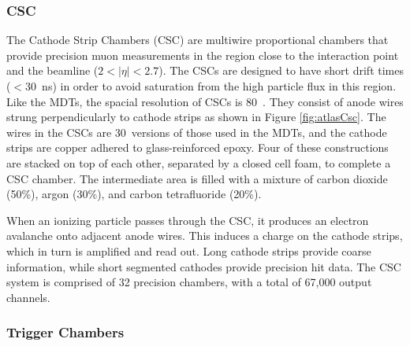 \cite{muonTdr}

\subsubsection{CSC} %

\begin{figure}[h!]
\captionsetup[subfigure]{position=b}
\centering
{}
\caption{}
\label{fig:}
\end{figure}

The Cathode Strip Chambers (CSC) are multiwire proportional chambers that provide precision muon measurements in the region close to the interaction point and the beamline ($2<|\eta|<2.7$).
The CSCs are designed to have short drift times ($<30$~ns) in order to avoid saturation from the high particle flux in this region.
Like the MDTs, the spacial resolution of CSCs is 80~\um.
They consist of anode wires strung perpendicularly to cathode strips as shown in Figure \ref{fig:atlasCsc}.
The wires in the CSCs are 30~\um versions of those used in the MDTs, and the cathode strips are copper adhered to glass-reinforced epoxy.
Four of these constructions are stacked on top of each other, separated by a closed cell foam, to complete a CSC chamber.
The intermediate area is filled with a mixture of carbon dioxide (50\%), argon (30\%), and carbon tetrafluoride (20\%).

When an ionizing particle passes through the CSC, it produces an electron avalanche onto adjacent anode wires.
This induces a charge on the cathode strips, which in turn is amplified and read out.
Long cathode strips provide coarse information, while short segmented cathodes provide precision hit data.
The CSC system is comprised of 32 precision chambers, with a total of 67,000 output channels.
\cite{muonTdr}

\subsubsection{Trigger Chambers}

